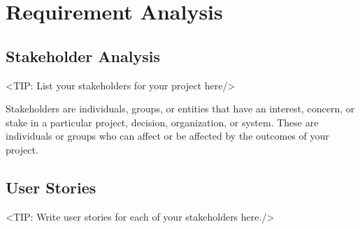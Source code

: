 
\newcommand{\userstory}[4]{%
    \refstepcounter{nuserstory}
    \subsection{#1}
    \label{userstory:\thenuserstory}
    \hangindent=40pt
    \textbf{\textit{As a}} #2,\\
    \textbf{\textit{I want to}} #3,\\
    \textbf{\textit{so that}} #4.
}


\newcommand{\userstory}[4]{%
    \refstepcounter{nuserstory}
    \subsection{#1}
    \label{userstory:\thenuserstory}
    \hangindent=40pt
    \textbf{\textit{As a}} #2,\\
    \textbf{\textit{I want to}} #3,\\
    \textbf{\textit{so that}} #4.
}
\newenvironment{usecase}[1]
{
    \refstepcounter{nusecase}%
    \subsection{Use Case \thenusecase: #1}%
    \label{usecase:\thenusecase}%
}{}

\chapter{Requirement Analysis}
\label{chap:requirement-analysis}

\section{Stakeholder Analysis}
\label{section:stakeholder-analysis}
<TIP: List your stakeholders for your project here/>

Stakeholders are individuals, groups, or entities that
have an interest, concern, or stake in a particular project, decision,
organization, or system. These are individuals or groups who can affect or be
affected by the outcomes of your project.

\section{User Stories}
\label{section:user-stories}
<TIP: Write user stories for each of your stakeholders here./>

